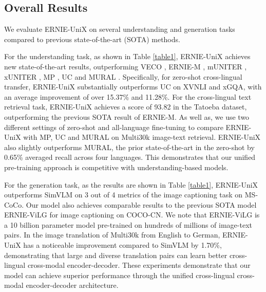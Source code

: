 \documentclass{article}
\begin{document}
\subsection{Overall Results}
We evaluate ERNIE-UniX on several understanding and generation tasks compared to previous state-of-the-art (SOTA) methods.  

For the understanding task, as shown in Table \ref{table1},  ERNIE-UniX achieves new state-of-the-art results, outperforming VECO  \cite{luo2021veco}, ERNIE-M \cite{erniem2020}, mUNITER  \cite{uniter2021}, xUNITER \cite{uniter2021}, MP \cite{m3p2020}, UC \cite{UC22021} and MURAL \cite{mural2021}. Specifically, for zero-shot cross-lingual transfer, ERNIE-UniX substantially outperforms UC on XVNLI and xGQA, with an average improvement of over 15.37\% and 11.28\%. For the cross-lingual text retrieval task, ERNIE-UniX achieves a score of 93.82 in the Tatoeba dataset, outperforming the previous SOTA result of ERNIE-M. As well as, we use two different settings of zero-shot and all-language fine-tuning to compare ERNIE-UniX with MP, UC and MURAL on Multi30k image-text retrieval. ERNIE-UniX also slightly outperforms MURAL, the prior state-of-the-art in the zero-shot by 0.65\% averaged recall across four languages. This demonstrates that our unified pre-training approach is competitive with understanding-based models. 

For the generation task, as the results are shown in Table \ref{table1}, 
ERNIE-UniX outperforms SimVLM \cite{simvlm2021} on 3 out of 4 metrics of the image captioning task on MS-CoCo. Our model also achieves comparable results to the previous SOTA model ERNIE-ViLG \cite{ernievilg2021} for image captioning on COCO-CN. We note that ERNIE-ViLG is a 10 billion parameter model pre-trained on hundreds of millions of image-text pairs. In the image translation of Multi30k from English to German, ERNIE-UniX has a noticeable improvement compared to SimVLM by 1.70\%, demonstrating that large and diverse translation pairs can learn better cross-lingual cross-modal encoder-decoder. These experiments demonstrate that our model can achieve superior performance through the unified cross-lingual cross-modal encoder-decoder architecture.
\end{document}
